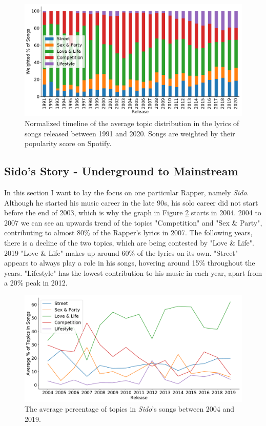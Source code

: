 \documentclass[conference]{IEEEtran}
\begin{document}
\begin{figure}[!t]
\includegraphics[width=\linewidth]{figures/w_timeline.pdf}
\vspace*{-8mm}
\caption{Normalized timeline of the average topic distribution in the lyrics of songs released between 1991 and 2020. Songs are weighted by their popularity score on Spotify.}
\label{fig:w_timeline}
\end{figure}

\subsection{Sido's Story - Underground to Mainstream}
In this section I want to lay the focus on one particular Rapper, namely \textit{Sido}. Although he started his music career in the late 90s, his solo career did not start before the end of 2003, which is why the graph in Figure \ref{fig:sido} starts in 2004. 2004 to 2007 we can see an upwards trend of the topics "Competition" and "Sex \& Party", contributing to almost 80\% of the Rapper's lyrics in 2007. The following years, there is a decline of the two topics, which are being contested by "Love \& Life". 2019 "Love \& Life" makes up around 60\% of the lyrics on its own. "Street" appears to always play a role in his songs, hovering around 15\% throughout the years. "Lifestyle" has the lowest contribution to his music in each year, apart from a 20\% peak in 2012.

\begin{figure}[!t]
\includegraphics[width=\linewidth]{figures/sido.pdf}
\vspace*{-8mm}
\caption{The average percentage of topics in \textit{Sido}'s songs between 2004 and 2019.}
\label{fig:sido}
\end{figure}
\end{document}
